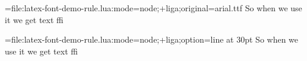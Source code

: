 \documentclass{article}
\begin{document}
\font\testluafont={file:latex-font-demo-rule.lua:mode=node;+liga;original=arial.ttf}
{\testluafont So when we use it we get text ffi}

\font\testluafont={file:latex-font-demo-rule.lua:mode=node;+liga;option=line} at 30pt
{\testluafont So when we use it we get text ffi}
\end{document}
